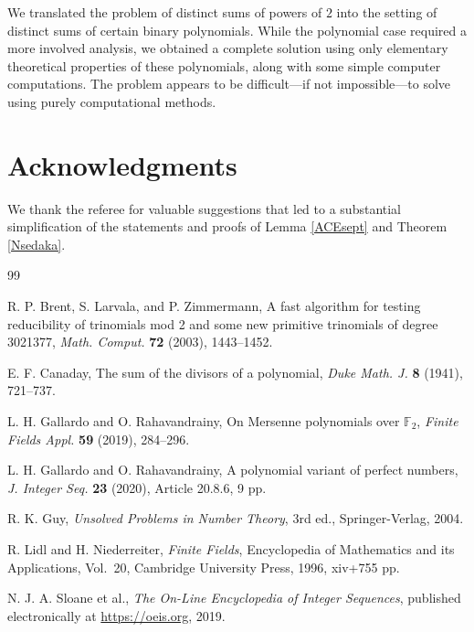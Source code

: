 \documentclass[12pt, reqno]{article}
\theoremstyle{plain}
\theoremstyle{definition}
\theoremstyle{remark}
\def\F{\mathbb{F}}
\begin{document}
We translated the problem of distinct sums of powers of $2$ into the setting of distinct sums of certain binary polynomials. While the polynomial case required a more involved analysis, we obtained a complete solution using only elementary theoretical properties of these polynomials, along with some simple computer computations. The problem appears to be difficult—if not impossible—to solve using purely computational methods.



\section{Acknowledgments}
We thank the referee for valuable suggestions that led to a substantial simplification of the statements and proofs of Lemma \ref{ACEsept} and Theorem \ref{Nsedaka}.

\begin{thebibliography}{99}

 R. P. Brent, S. Larvala, and P. Zimmermann,  
A fast algorithm for testing reducibility of trinomials mod 2 and some new primitive trinomials of degree 3021377,  
\textit{Math. Comput.} \textbf{72} (2003), 1443--1452.

 E. F. Canaday,  
The sum of the divisors of a polynomial,  
\textit{Duke Math. J.} \textbf{8} (1941), 721--737.

 L. H. Gallardo and O. Rahavandrainy,  
On Mersenne polynomials over $\F_{2}$,  
\textit{Finite Fields Appl.} \textbf{59} (2019), 284--296.

 L. H. Gallardo and O. Rahavandrainy,  
A polynomial variant of perfect numbers,  
\textit{J. Integer Seq.} \textbf{23} (2020), Article 20.8.6, 9 pp.

 R. K. Guy,  
\textit{Unsolved Problems in Number Theory}, 3rd ed., Springer-Verlag, 2004.

 R. Lidl and H. Niederreiter,  
\textit{Finite Fields}, Encyclopedia of Mathematics and its Applications, Vol.~20,  
Cambridge University Press, 1996, xiv+755 pp.

 N. J. A. Sloane et al.,  
\textit{The On-Line Encyclopedia of Integer Sequences}, published electronically at  
\url{https://oeis.org}, 2019.

\end{thebibliography}
\end{document}

